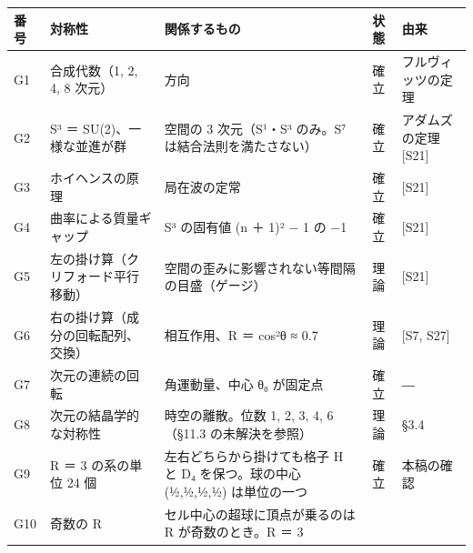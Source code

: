 \documentclass[
  a4paper,
]{ltjsarticle}
\newcounter{none} %
\begin{document}
{\def\LTcaptype{none} %
\begin{longtable}[]{@{}
  >{\raggedright\arraybackslash}p{}
  >{\raggedright\arraybackslash}p{}
  >{\raggedright\arraybackslash}p{}
  >{\raggedright\arraybackslash}p{}
  >{\raggedright\arraybackslash}p{}@{}}
\toprule\noalign{}
\begin{minipage}[b]{\linewidth}\raggedright
番号
\end{minipage} & \begin{minipage}[b]{\linewidth}\raggedright
対称性
\end{minipage} & \begin{minipage}[b]{\linewidth}\raggedright
関係するもの
\end{minipage} & \begin{minipage}[b]{\linewidth}\raggedright
状態
\end{minipage} & \begin{minipage}[b]{\linewidth}\raggedright
由来
\end{minipage} \\
\midrule\noalign{}
\endhead
\bottomrule\noalign{}
\endlastfoot
G1 & 合成代数（1, 2, 4, 8 次元） & 8 方向 & 確立 & フルヴィッツの定理 \\
G2 & S³ ＝ SU(2)、一様な並進が群 & 空間の 3 次元（S¹・S³ のみ。S⁷
は結合法則を満たさない） & 確立 & アダムズの定理 {[}S21{]} \\
G3 & ホイヘンスの原理 & 局在波の定常 & 確立 & {[}S21{]} \\
G4 & 曲率による質量ギャップ & S³ の固有値 (n ＋ 1)² − 1 の −1 & 確立 &
{[}S21{]} \\
G5 & 左の掛け算（クリフォード平行移動） &
空間の歪みに影響されない等間隔の目盛（ゲージ） & 理論 & {[}S21{]} \\
G6 & 右の掛け算（成分の回転配列、交換） & 相互作用、R ＝ cos²θ ≈ 0.7 &
理論 & {[}S7, S27{]} \\
G7 & 3 次元の連続の回転 & 角運動量、中心 θ₀ が固定点 & 確立 & ― \\
G8 & 4 次元の結晶学的な対称性 & 時空の離散。位数 1, 2, 3, 4, 6（§11.3
の未解決を参照） & 理論 & §3.4 \\
G9 & R ＝ 3 の系の単位 24 個 & 左右どちらから掛けても格子 H と D₄
を保つ。球の中心 (½,½,½,½) は単位の一つ & 確立 & 本稿の確認 \\
G10 & 奇数の R & セル中心の超球に頂点が乗るのは R が奇数のとき。R ＝ 3

\end{longtable}}
\end{document}
